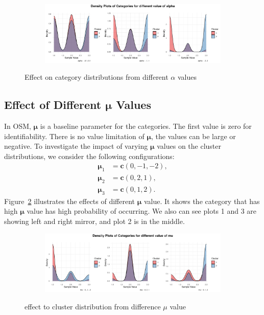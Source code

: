 \documentclass{article}
\begin{document}
\begin{figure}[htbp!]
  \centering
  \begin{subfigure}{1.0\textwidth}
      \centering
      \includegraphics[width=\textwidth]{images/para_sim/alpha.png}
  \end{subfigure}
  \caption{Effect on category distributions from different $\alpha$ values}
  \label{fig:alpha}
\end{figure}

\subsection{Effect of Different $\bm{\mu}$ Values}
In OSM, $\bm{\mu}$ is a baseline parameter for the categories. 
The first value is zero for identifiability. There is no value limitation of $\bm{\mu}$, the values can be large or negative.
To investigate the impact of varying $\bm{\mu}$ values on the cluster distributions, 
we consider the following configurations:
\[
\begin{aligned}
  \bm{\mu}_1 &= \mathbf{c}(0, -1, -2), \\
  \bm{\mu}_2 &= \mathbf{c}(0, 2, 1), \\
  \bm{\mu}_3 &= \mathbf{c}(0, 1, 2).
\end{aligned}
\]
Figure~\ref{fig:mu} illustrates the effects of different $\bm{\mu}$ value.
It shows the category that has high $\bm{\mu}$ value has high probability of occurring.
We also can see plots 1 and 3 are showing left and right mirror,
and plot 2 is in the middle.

\begin{figure}[htbp!]
  \centering
  \begin{subfigure}{1.0\textwidth}
      \centering
      \includegraphics[width=\textwidth]{images/para_sim/mu.png}
  \end{subfigure}
  \caption{effect to cluster distribution from difference $\mu$ value}
  \label{fig:mu}
\end{figure}
\end{document}
